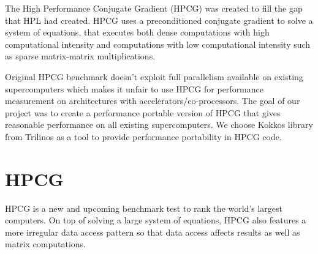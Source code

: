 \documentclass{ccr15}
\begin{document}
The High Performance Conjugate Gradient (HPCG)\cite{ZAB:TechHPCG}\cite{ZAB:TechHPCG2} was created to fill the gap that HPL had created.
HPCG uses a preconditioned conjugate gradient to solve a system of equations, that executes both
dense computations with high computational intensity and computations with low computational intensity such as sparse matrix-matrix multiplications.

Original HPCG benchmark doesn't exploit full parallelism available on existing supercomputers which makes it unfair to use HPCG for performance measurement on architectures with accelerators/co-processors.
The goal of our project was to create a performance portable version of HPCG that gives reasonable performance on all existing supercomputers. 
We choose  Kokkos\cite{ZAB:Kokkos} library from Trilinos\cite{ZAB:Trilinos} as a tool to provide performance portability in HPCG code.


\section{HPCG}

HPCG is a new and
upcoming benchmark test to rank the world's largest computers. On top
of solving a large system of equations, HPCG also features a more irregular data access pattern
so that data access affects results as well as matrix computations.
\end{document}
